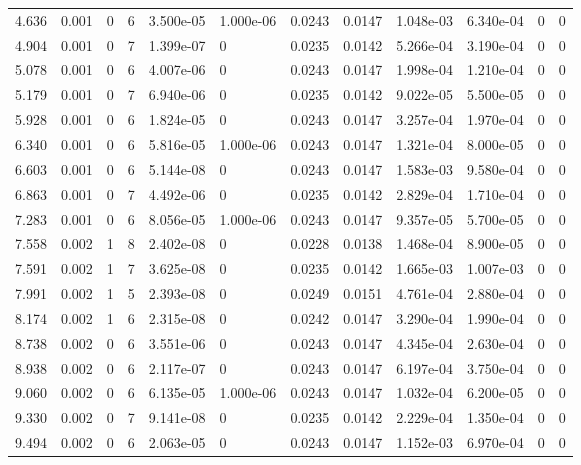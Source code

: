\documentclass[preview]{standalone}
\begin{document}
{{\begin{tabular}{L{1.2cm}C{1.2cm} C{0.3cm}C{0.5cm} C{1.4cm}C{1.4cm} C{1.4cm}C{1.4cm} C{1.6cm}C{1.6cm} C{1.6cm}C{1.6cm}}
  4.636  &  0.001  & 0     &  6 &  3.500e-05  & 1.000e-06  &  0.0243&   0.0147& 1.048e-03 & 6.340e-04   &  0 & 0  \\ 
  4.904  &  0.001  & 0     &  7 &  1.399e-07  & 0  &  0.0235&   0.0142& 5.266e-04 & 3.190e-04   &  0 & 0  \\ 
  5.078  &  0.001  & 0     &  6 &  4.007e-06  & 0  &  0.0243&   0.0147& 1.998e-04 & 1.210e-04   &  0 & 0  \\ 
  5.179  &  0.001  & 0     &  7 &  6.940e-06  & 0  &  0.0235&   0.0142& 9.022e-05 & 5.500e-05   &  0 & 0  \\ 
  5.928  &  0.001  & 0     &  6 &  1.824e-05  & 0  &  0.0243&   0.0147& 3.257e-04 & 1.970e-04   &  0 & 0  \\ 
  6.340  &  0.001  & 0     &  6 &  5.816e-05  & 1.000e-06  &  0.0243&   0.0147& 1.321e-04 & 8.000e-05   &  0 & 0  \\ 
  6.603  &  0.001  & 0     &  6 &  5.144e-08  & 0  &  0.0243&   0.0147& 1.583e-03 & 9.580e-04   &  0 & 0  \\ 
  6.863  &  0.001  & 0     &  7 &  4.492e-06  & 0  &  0.0235&   0.0142& 2.829e-04 & 1.710e-04   &  0 & 0  \\ 
  7.283  &  0.001  & 0     &  6 &  8.056e-05  & 1.000e-06  &  0.0243&   0.0147& 9.357e-05 & 5.700e-05   &  0 & 0  \\ 
  7.558  &  0.002  & 1     &  8 &  2.402e-08  & 0  &  0.0228&   0.0138& 1.468e-04 & 8.900e-05   &  0 & 0  \\ 
  7.591  &  0.002  & 1     &  7 &  3.625e-08  & 0  &  0.0235&   0.0142& 1.665e-03 & 1.007e-03   &  0 & 0  \\ 
  7.991  &  0.002  & 1     &  5 &  2.393e-08  & 0  &  0.0249&   0.0151& 4.761e-04 & 2.880e-04   &  0 & 0  \\ 
  8.174  &  0.002  & 1     &  6 &  2.315e-08  & 0  &  0.0242&   0.0147& 3.290e-04 & 1.990e-04   &  0 & 0  \\ 
  8.738  &  0.002  & 0     &  6 &  3.551e-06  & 0  &  0.0243&   0.0147& 4.345e-04 & 2.630e-04   &  0 & 0  \\ 
  8.938  &  0.002  & 0     &  6 &  2.117e-07  & 0  &  0.0243&   0.0147& 6.197e-04 & 3.750e-04   &  0 & 0  \\ 
  9.060  &  0.002  & 0     &  6 &  6.135e-05  & 1.000e-06  &  0.0243&   0.0147& 1.032e-04 & 6.200e-05   &  0 & 0  \\ 
  9.330  &  0.002  & 0     &  7 &  9.141e-08  & 0  &  0.0235&   0.0142& 2.229e-04 & 1.350e-04   &  0 & 0  \\ 
  9.494  &  0.002  & 0     &  6 &  2.063e-05  & 0  &  0.0243&   0.0147& 1.152e-03 & 6.970e-04   &  0 & 0  \\ 

\end{tabular}}}
\end{document}
